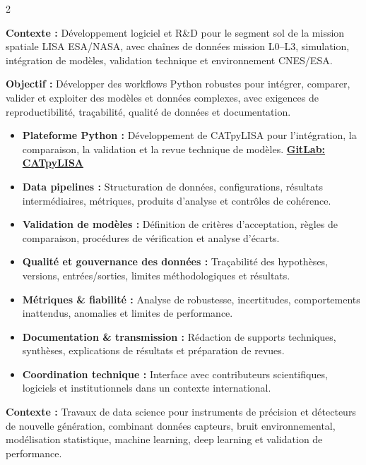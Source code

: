 \documentclass[8pt,a4paper,ragged2e,withhyper]{altacv}
\begin{document}
\begin{paracol}{2}
\divider


\textbf{Contexte :} Développement logiciel et R\&D pour le segment sol de la mission spatiale LISA ESA/NASA, avec chaînes de données mission L0--L3, simulation, intégration de modèles, validation technique et environnement CNES/ESA.

\textbf{Objectif :} Développer des workflows Python robustes pour intégrer, comparer, valider et exploiter des modèles et données complexes, avec exigences de reproductibilité, traçabilité, qualité de données et documentation.

\begin{itemize}
  \item \textbf{Plateforme Python :} Développement de CATpyLISA pour l’intégration, la comparaison, la validation et la revue technique de modèles.
  \textcolor{DarkPastelRed}{\href{https://gitlab.oca.eu/gboileau/lisa_l3_tools}{\bf GitLab: CATpyLISA}}
  \item \textbf{Data pipelines :} Structuration de données, configurations, résultats intermédiaires, métriques, produits d’analyse et contrôles de cohérence.
  \item \textbf{Validation de modèles :} Définition de critères d’acceptation, règles de comparaison, procédures de vérification et analyse d’écarts.
  \item \textbf{Qualité et gouvernance des données :} Traçabilité des hypothèses, versions, entrées/sorties, limites méthodologiques et résultats.
  \item \textbf{Métriques \& fiabilité :} Analyse de robustesse, incertitudes, comportements inattendus, anomalies et limites de performance.
  \item \textbf{Documentation \& transmission :} Rédaction de supports techniques, synthèses, explications de résultats et préparation de revues.
  \item \textbf{Coordination technique :} Interface avec contributeurs scientifiques, logiciels et institutionnels dans un contexte international.
\end{itemize}

\divider


\textbf{Contexte :} Travaux de data science pour instruments de précision et détecteurs de nouvelle génération, combinant données capteurs, bruit environnemental, modélisation statistique, machine learning, deep learning et validation de performance.


\end{paracol}
\end{document}
